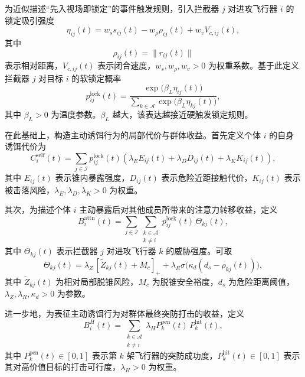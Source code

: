 为近似描述“先入视场即锁定”的事件触发规则，引入拦截器 $j$ 对进攻飞行器 $i$ 的锁定吸引强度
\begin{equation}
\eta_{ij}(t)
=
w_s s_{ij}(t)
-
w_{\rho}\rho_{ij}(t)
+
w_v V_{c,ij}(t),
\end{equation}
其中
\[
\rho_{ij}(t)=\|r_{ij}(t)\|
\]
表示相对距离，$V_{c,ij}(t)$ 表示闭合速度，$w_s,w_{\rho},w_v>0$ 为权重系数。基于此定义拦截器 $j$ 对目标 $i$ 的软锁定概率
\begin{equation}
p_{ij}^{\mathrm{lock}}(t)
=
\frac{\exp\!\bigl(\beta_L \eta_{ij}(t)\bigr)}
{\sum\limits_{k\in\mathcal{A}}\exp\!\bigl(\beta_L \eta_{kj}(t)\bigr)},
\end{equation}
其中 $\beta_L>0$ 为温度参数。$\beta_L$ 越大，该表达越接近硬触发锁定规则。

在此基础上，构造主动诱饵行为的局部代价与群体收益。首先定义个体 $i$ 的自身诱饵代价为
\begin{equation}
C_i^{\mathrm{self}}(t)
=
\sum_{j\in\mathcal{I}}
p_{ij}^{\mathrm{lock}}(t)
\left(
\lambda_E E_{ij}(t)
+
\lambda_D D_{ij}(t)
+
\lambda_K K_{ij}(t)
\right),
\end{equation}
其中 $E_{ij}(t)$ 表示锥内暴露强度，$D_{ij}(t)$ 表示危险近距接触代价，$K_{ij}(t)$ 表示被击落风险，$\lambda_E,\lambda_D,\lambda_K>0$ 为权重。

其次，为描述个体 $i$ 主动暴露后对其他成员所带来的注意力转移收益，定义
\begin{equation}
B_i^{\mathrm{attn}}(t)
=
\sum_{j\in\mathcal{I}}
\sum_{\substack{k\in\mathcal{A}\\k\neq i}}
p_{ij}^{\mathrm{lock}}(t)\,\Theta_{kj}(t),
\end{equation}
其中 $\Theta_{kj}(t)$ 表示拦截器 $j$ 对进攻飞行器 $k$ 的威胁强度。可取
\begin{equation}
\Theta_{kj}(t)
=
\lambda_Z\,[\widetilde{Z}_{kj}(t)+M_c]_+
+
\lambda_R \sigma\!\bigl(\kappa_d(d_s-\rho_{kj}(t))\bigr),
\end{equation}
其中 $\widetilde{Z}_{kj}(t)$ 为相对局部脱锥风险，$M_c$ 为脱锥安全裕度，$d_s$ 为危险距离阈值，$\lambda_Z,\lambda_R,\kappa_d>0$ 为参数。

进一步地，为表征主动诱饵行为对群体最终突防打击的收益，定义
\begin{equation}
B_i^{H}(t)
=
\sum_{\substack{k\in\mathcal{A}\\k\neq i}}
\lambda_H P_k^{\mathrm{pen}}(t)\,P_k^{\mathrm{hit}}(t),
\end{equation}
其中 $P_k^{\mathrm{pen}}(t)\in[0,1]$ 表示第 $k$ 架飞行器的突防成功度，$P_k^{\mathrm{hit}}(t)\in[0,1]$ 表示其对高价值目标的打击可行度，$\lambda_H>0$ 为权重。

